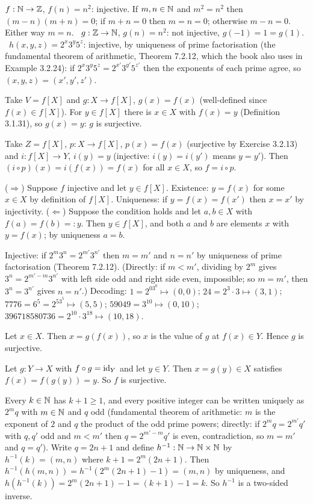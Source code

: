 $f:\mathbb{N}\to\mathbb{Z}$, $f(n)=n^2$: injective. If $m,n\in\mathbb{N}$ and $m^2=n^2$ then $(m-n)(m+n)=0$; if $m+n=0$ then $m=n=0$; otherwise $m-n=0$. Either way $m=n$. \ $g:\mathbb{Z}\to\mathbb{N}$, $g(n)=n^2$: not injective, $g(-1)=1=g(1)$. \ $h(x,y,z)=2^x3^y5^z$: injective, by uniqueness of prime factorisation (the fundamental theorem of arithmetic, Theorem 7.2.12, which the book also uses in Example 3.2.24): if $2^x3^y5^z=2^{x'}3^{y'}5^{z'}$ then the exponents of each prime agree, so $(x,y,z)=(x',y',z')$.

 Take $V=f[X]$ and $g:X\to f[X]$, $g(x)=f(x)$ (well-defined since $f(x)\in f[X]$). For $y\in f[X]$ there is $x\in X$ with $f(x)=y$ (Definition 3.1.31), so $g(x)=y$: $g$ is surjective.

 Take $Z=f[X]$, $p:X\to f[X]$, $p(x)=f(x)$ (surjective by Exercise 3.2.13) and $i:f[X]\to Y$, $i(y)=y$ (injective: $i(y)=i(y')$ means $y=y'$). Then $(i\circ p)(x)=i(f(x))=f(x)$ for all $x\in X$, so $f=i\circ p$.

 ($\Rightarrow$) Suppose $f$ injective and let $y\in f[X]$. Existence: $y=f(x)$ for some $x\in X$ by definition of $f[X]$. Uniqueness: if $y=f(x)=f(x')$ then $x=x'$ by injectivity. ($\Leftarrow$) Suppose the condition holds and let $a,b\in X$ with $f(a)=f(b)=:y$. Then $y\in f[X]$, and both $a$ and $b$ are elements $x$ with $y=f(x)$; by uniqueness $a=b$.

 Injective: if $2^m3^n=2^{m'}3^{n'}$ then $m=m'$ and $n=n'$ by uniqueness of prime factorisation (Theorem 7.2.12). (Directly: if $m<m'$, dividing by $2^m$ gives $3^n=2^{m'-m}3^{n'}$ with left side odd and right side even, impossible; so $m=m'$, then $3^n=3^{n'}$ gives $n=n'$.) Decoding: $1=2^03^0\mapsto(0,0)$; $24=2^3\cdot3\mapsto(3,1)$; $7776=6^5=2^53^5\mapsto(5,5)$; $59049=3^{10}\mapsto(0,10)$; $396718580736=2^{10}\cdot3^{18}\mapsto(10,18)$.

 Let $x\in X$. Then $x=g(f(x))$, so $x$ is the value of $g$ at $f(x)\in Y$. Hence $g$ is surjective.

 Let $g:Y\to X$ with $f\circ g=\mathrm{id}_Y$ and let $y\in Y$. Then $x=g(y)\in X$ satisfies $f(x)=f(g(y))=y$. So $f$ is surjective.

 Every $k\in\mathbb{N}$ has $k+1\ge1$, and every positive integer can be written uniquely as $2^m q$ with $m\in\mathbb{N}$ and $q$ odd (fundamental theorem of arithmetic: $m$ is the exponent of $2$ and $q$ the product of the odd prime powers; directly: if $2^mq=2^{m'}q'$ with $q,q'$ odd and $m<m'$ then $q=2^{m'-m}q'$ is even, contradiction, so $m=m'$ and $q=q'$). Write $q=2n+1$ and define $h^{-1}:\mathbb{N}\to\mathbb{N}\times\mathbb{N}$ by $h^{-1}(k)=(m,n)$ where $k+1=2^m(2n+1)$. Then $h^{-1}(h(m,n))=h^{-1}(2^m(2n+1)-1)=(m,n)$ by uniqueness, and $h(h^{-1}(k))=2^m(2n+1)-1=(k+1)-1=k$. So $h^{-1}$ is a two-sided inverse.

